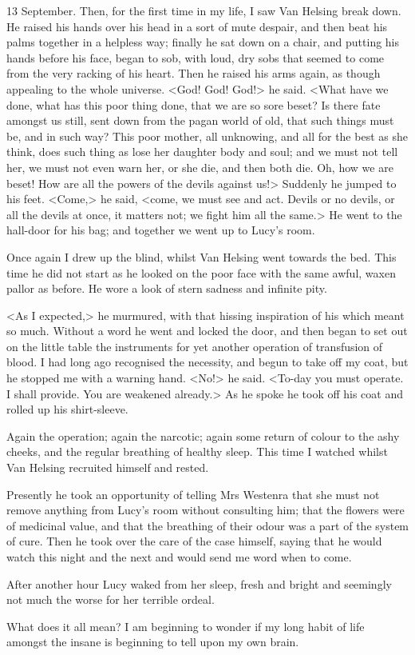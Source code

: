 \begin{diary}{13 September.}
Then, for the first time in my life, I saw Van Helsing break down. He raised his hands over his head in a sort of mute despair, and then beat his palms together in a helpless way; finally he sat down on a chair, and putting his hands before his face, began to sob, with loud, dry sobs that seemed to come from the very racking of his heart. Then he raised his arms again, as though appealing to the whole universe. <God! God! God!> he said. <What have we done, what has this poor thing done, that we are so sore beset? Is there fate amongst us still, sent down from the pagan world of old, that such things must be, and in such way? This poor mother, all unknowing, and all for the best as she think, does such thing as lose her daughter body and soul; and we must not tell her, we must not even warn her, or she die, and then both die. Oh, how we are beset! How are all the powers of the devils against us!> Suddenly he jumped to his feet. <Come,> he said, <come, we must see and act. Devils or no devils, or all the devils at once, it matters not; we fight him all the same.> He went to the hall-door for his bag; and together we went up to Lucy's room.

Once again I drew up the blind, whilst Van Helsing went towards the bed. This time he did not start as he looked on the poor face with the same awful, waxen pallor as before. He wore a look of stern sadness and infinite pity.

<As I expected,> he murmured, with that hissing inspiration of his which meant so much. Without a word he went and locked the door, and then began to set out on the little table the instruments for yet another operation of transfusion of blood. I had long ago recognised the necessity, and begun to take off my coat, but he stopped me with a warning hand. <No!> he said. <To-day you must operate. I shall provide. You are weakened already.> As he spoke he took off his coat and rolled up his shirt-sleeve.

Again the operation; again the narcotic; again some return of colour to the ashy cheeks, and the regular breathing of healthy sleep. This time I watched whilst Van Helsing recruited himself and rested.

Presently he took an opportunity of telling Mrs Westenra that she must not remove anything from Lucy's room without consulting him; that the flowers were of medicinal value, and that the breathing of their odour was a part of the system of cure. Then he took over the care of the case himself, saying that he would watch this night and the next and would send me word when to come.

After another hour Lucy waked from her sleep, fresh and bright and seemingly not much the worse for her terrible ordeal.

What does it all mean? I am beginning to wonder if my long habit of life amongst the insane is beginning to tell upon my own brain.
\end{diary}


